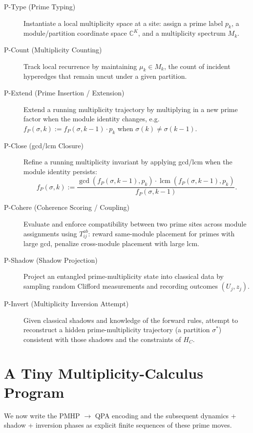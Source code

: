 \documentclass[11pt]{article}
\begin{document}
\begin{description}
  \item[P-Type (Prime Typing)] Instantiate a local multiplicity space at a site: assign a prime label $p_k$, a module/partition coordinate space $\mathbb{C}^K$, and a multiplicity spectrum $M_k$.

  \item[P-Count (Multiplicity Counting)] Track local recurrence by maintaining $\mu_k \in M_k$, the count of incident hyperedges that remain uncut under a given partition.

  \item[P-Extend (Prime Insertion / Extension)] Extend a running multiplicity trajectory by multiplying in a new prime factor when the module identity changes, e.g.\ $f_P(\sigma,k) := f_P(\sigma,k-1)\cdot p_k$ when $\sigma(k)\neq\sigma(k-1)$.

  \item[P-Close (gcd/lcm Closure)] Refine a running multiplicity invariant by applying gcd/lcm when the module identity persists:
  \[
    f_P(\sigma,k) := \frac{\gcd(f_P(\sigma,k-1),p_k)\cdot
                          \operatorname{lcm}(f_P(\sigma,k-1),p_k)}
                         {f_P(\sigma,k-1)}.
  \]

  \item[P-Cohere (Coherence Scoring / Coupling)] Evaluate and enforce compatibility between two prime sites across module assignments using $T_{ij}^{ab}$: reward same-module placement for primes with large gcd, penalize cross-module placement with large lcm.

  \item[P-Shadow (Shadow Projection)] Project an entangled prime-multiplicity state into classical data by sampling random Clifford measurements and recording outcomes $(U_j,z_j)$.

  \item[P-Invert (Multiplicity Inversion Attempt)] Given classical shadows and knowledge of the forward rules, attempt to reconstruct a hidden prime-multiplicity trajectory (a partition $\sigma^*$) consistent with those shadows and the constraints of $H_C$.
\end{description}

\section{A Tiny Multiplicity-Calculus Program}

We now write the PMHP $\to$ QPA encoding and the subsequent dynamics + shadow + inversion phases as explicit finite sequences of these prime moves.
\end{document}

